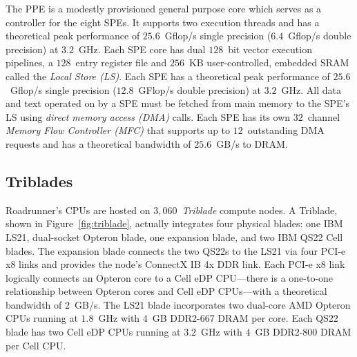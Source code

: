 \documentclass[journal,twoside]{IEEEtran}
\newcommand{\fig}[1]{Figure~\ref{fig:#1}}
\begin{document}
The PPE is a modestly provisioned general purpose core which serves as
a controller for the eight SPEs.  It supports two execution threads and
has a theoretical peak performance of $25.6$~Gflop/s single precision
($6.4$~Gflop/s double precision) at $3.2$~GHz.  Each SPE core has dual
$128$~bit vector execution pipelines, a $128$~entry register file and
$256$~KB user-controlled, embedded SRAM called the \emph{Local Store
(LS)}.  Each SPE has a theoretical peak performance of $25.6$~Gflop/s
single precision ($12.8$~GFlop/s double precision) at $3.2$~GHz.  All
data and text operated on by a SPE must be fetched from main memory to
the SPE's LS using \emph{direct memory access (DMA)} calls.  Each SPE
has its own $32$~channel \emph{Memory Flow Controller (MFC)} that
supports up to $12$~outstanding DMA requests and has a theoretical
bandwidth of $25.6$~GB/s to DRAM.

\subsection{Triblades}

Roadrunner's CPUs are hosted on $3,060$~\emph{Triblade} compute nodes.
A Triblade, shown in \fig{triblade}, actually integrates four physical
blades: one IBM LS21, dual-socket Opteron blade, one expansion blade,
and two IBM QS22 Cell blades.  The expansion blade connects the two
QS22s to the LS21 via four PCI-e x8 links and provides the node's
ConnectX IB 4x DDR link.  Each PCI-e x8 link logically connects an
Opteron core to a Cell eDP CPU---there is a one-to-one relationship
between Opteron cores and Cell eDP CPUs---with a theoretical bandwidth
of $2$~GB/s.  The LS21 blade incorporates two dual-core AMD Opteron
CPUs running at $1.8$~GHz with $4$~GB DDR2-667 DRAM per core.  Each
QS22 blade has two Cell eDP CPUs running at $3.2$~GHz with $4$~GB
DDR2-800 DRAM per Cell CPU.
\end{document}
